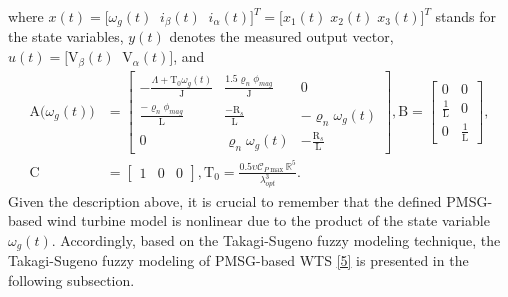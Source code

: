 \documentclass[preprint,11pt]{elsarticle}
\begin{document}
where $x(t)=\big[\omega_g(t)\;\; i_{\beta}(t)\;\;i_{\alpha}(t)\big]^T=\big[x_1(t)\; x_2(t)\;x_3(t)\big]^T$ stands for the state variables, $y(t)$ denotes the measured output vector, $u(t)=\big[ \mathrm{V}_{\beta}(t)\;\;\mathrm{V}_{\alpha}(t) \big]$, and
\begin{align*}
\mathrm{A}\big( \omega_g(t) \big)&=
\begin{bmatrix}
-\frac{\Lambda+\mathrm{T}_0 \omega_g(t) }{\mathrm{J}}  &  \frac{1.5\varrho_n \phi_{mag}}{\mathrm{J}}& 0\\
\frac{-\varrho_n \phi_{mag} }{\mathrm{L}}&  \frac{-\mathrm{R}_s}{\mathrm{L}}& -\varrho_n  \omega_g(t)\\
0 & \varrho_n  \omega_g(t)& -\frac{\mathrm{R}_s}{\mathrm{L}}
\end{bmatrix},
\mathrm{B}=
\begin{bmatrix}
0&0\\
\frac{1}{\mathrm{L}}&0\\
0&\frac{1}{\mathrm{L}}
\end{bmatrix},\\
\mathrm{C}&=
\begin{bmatrix}
1&0&0
\end{bmatrix},\mathrm{T}_0=\frac{0.5\upsilon\mathcal{C}_{P\max}  \mathbb{R}^5}{\lambda_{opt}^3}.
\end{align*}
{Given the description above, it is crucial to remember that the defined PMSG-based wind turbine model is nonlinear due to the product of the state variable $\omega_g(t)$. Accordingly, based on the Takagi-Sugeno fuzzy modeling technique, the Takagi-Sugeno fuzzy modeling of PMSG-based WTS \eqref{5} is presented in the following subsection.}
\end{document}
